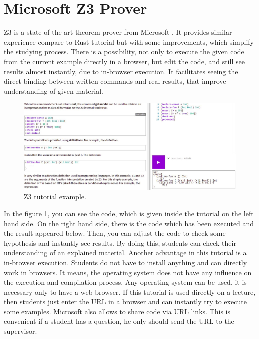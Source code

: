 \section{Microsoft Z3 Prover} \label{sec:z3}
Z3 is a state-of-the art theorem prover from Microsoft \cite{Z3Prover}. It provides similar experience compare to Rust tutorial but with some improvements, which simplify the studying process. There is a possibility, not only to execute the given code from the current example directly in a browser, but edit the code, and still see results almost instantly, due to in-browser execution. It facilitates seeing the direct binding between written commands and real results, that improve understanding of given material.
\begin{figure}[h!]
    \centering
    \includegraphics[width=\linewidth]{src/pic/z3}
    \caption{Z3 tutorial example.}
    \label{fig:z3}
\end{figure}
In the figure \ref{fig:z3}, you can see the code, which is given inside the tutorial on the left hand side. On the right hand side, there is the code which has been executed and the result appeared below. Then, you can adjust the code to check some hypothesis and instantly see results. By doing this, students can check their understanding of an explained material. Another advantage in this tutorial is a in-browser execution. Students do not have to install anything and can directly work in browsers. It means, the operating system does not have any influence on the execution and compilation process. Any operating system can be used, it is necessary only to have a web-browser. If this tutorial is used directly on a lecture, then students just enter the URL in a browser and can instantly try to execute some examples. Microsoft also allows to share code via URL links. This is convenient if a student has a question, he only should send the URL to the supervisor.

